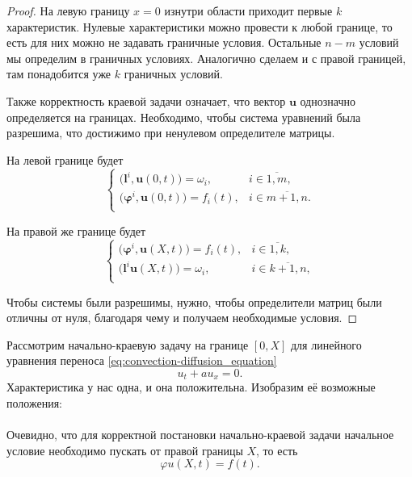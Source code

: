 \documentclass[../main.tex]{subfile}
\begin{document}
\begin{proof}
	На левую границу $x=0$ изнутри области приходит первые $k$
	характеристик. Нулевые характеристики можно провести к любой границе,
	то есть для них можно не задавать граничные условия. Остальные $n-m$
	условий мы определим в граничных условиях. Аналогично сделаем и с правой
	границей, там понадобится уже $k$ граничных условий.

	Также корректность краевой задачи означает, что вектор $\boldsymbol u$
	однозначно определяется на границах. Необходимо, чтобы система уравнений
	была разрешима, что достижимо при ненулевом определителе матрицы.

	На левой границе будет
	\[
	\begin{cases}
		\big(\boldsymbol l^i,\boldsymbol u(0,t)\big)=\omega_i, &
			i\in\overline{1,m}, \\
		\big(\boldsymbol\varphi^i,\boldsymbol u(0,t)\big)=f_i(t), &
			i\in\overline{m+1,n}. \\
	\end{cases}
	\]

	На правой же границе будет
	\[
	\begin{cases}
		\big(\boldsymbol\varphi^i,\boldsymbol u(X,t)\big)=f_i(t), &
			i\in\overline{1,k}, \\
		\big(\boldsymbol l^i\boldsymbol u(X,t)\big)=\omega_i, &
			i\in\overline{k+1,n}, \\
	\end{cases}
	\]

	Чтобы системы были разрешимы, нужно, чтобы определители матриц были
	отличны от нуля, благодаря чему и получаем необходимые условия.
\end{proof}

\begin{example}
	Рассмотрим начально-краевую задачу на границе $[0,X]$ для линейного
	уравнения переноса \eqref{eq:convection-diffusion_equation}
	\[u_t+au_x=0.\]
	Характеристика у нас одна, и она положительна. Изобразим её возможные
	положения: \\

	 \\

	Очевидно, что для корректной постановки начально-краевой задачи
	начальное условие необходимо пускать от правой границы $X$, то есть
	\[\varphi u(X,t)=f(t).\]
\end{example}
\end{document}
